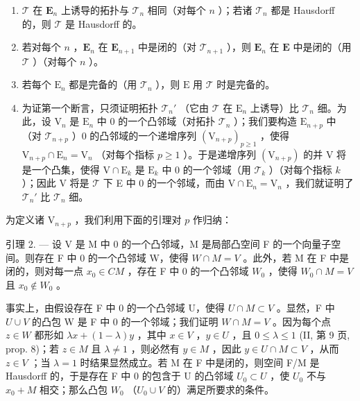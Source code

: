 \begin{enumerate}
\def\labelenumi{(\roman{enumi})}
\item
  \(\mathcal{T}\) 在 \(\mathbf{E}_n\) 上诱导的拓扑与 \(\mathcal{T}_n\) 相同（对每个 \(n\) ）；若诸 \(\mathcal{T}_n\) 都是 Hausdorff 的，则 \(\mathcal{T}\) 是 Hausdorff 的。
\item
  若对每个 \(n\) ，\(\mathbf{E}_n\) 在 \(\mathbf{E}_{n+1}\) 中是闭的（对 \(\mathcal{T}_{n+1}\) ），则 \(\mathbf{E}_n\) 在 \(\mathbf{E}\) 中是闭的（用 \(\mathcal{T}\) ）（对每个 \(n\) ）。
\item
  若每个 \(\mathrm{E}_n\) 都是完备的（用 \(\mathcal{T}_n\) ），则 \(\mathrm{E}\) 用 \(\mathcal{T}\) 时是完备的。
\item
  为证第一个断言，只须证明拓扑 \(\mathcal{T}_n'\) （它由 \(\mathcal{T}\) 在 \(\mathrm{E}_n\) 上诱导）比 \(\mathcal{T}_n\) 细。为此，设 \(\mathrm{V}_n\) 是 \(\mathrm{E}_n\) 中 0 的一个凸邻域（对拓扑 \(\mathcal{T}_n\) ）；我们要构造 \(\mathrm{E}_{n+p}\) 中（对 \(\mathcal{T}_{n+p}\) ）0 的凸邻域的一个递增序列 \((\mathrm{V}_{n+p})_{p\geqslant 1}\) ，使得 \(\mathrm{V}_{n+p} \cap \mathrm{E}_n = \mathrm{V}_n\) （对每个指标 \(p \geqslant 1\) ）。于是递增序列 \((\mathrm{V}_{n+p})\) 的并 V 将是一个凸集，使得 \(\mathrm{V} \cap \mathrm{E}_k\) 是 \(\mathrm{E}_k\) 中 0 的一个邻域（用 \(\mathcal{T}_k\) ）（对每个指标 \(k\) ）；因此 V 将是 \(\mathcal{T}\) 下 E 中 0 的一个邻域，而由 \(\mathrm{V} \cap \mathrm{E}_n = \mathrm{V}_n\) ，我们就证明了 \(\mathcal{T}_n'\) 比 \(\mathcal{T}_n\) 细。
\end{enumerate}

为定义诸 \(\mathrm{V}_{n + p}\) ，我们利用下面的引理对 \(p\) 作归纳：

引理 2. --- 设 V 是 M 中 0 的一个凸邻域，M 是局部凸空间 F 的一个向量子空间。则存在 F 中 0 的一个凸邻域 W，使得 \(W \cap M = V\) 。此外，若 M 在 F 中是闭的，则对每一点 \(x_{0} \in C M\) ，存在 F 中 0 的一个凸邻域 \(W_{0}\) ，使得 \(W_{0} \cap M = V\) 且 \(x_{0} \notin W_{0}\) 。

事实上，由假设存在 F 中 0 的一个凸邻域 U，使得 \(U \cap M \subset V\) 。显然，F 中 \(U \cup V\) 的凸包 W 是 F 中 0 的一个邻域；我们证明 \(W \cap M = V\) 。因为每个点 \(z \in W\) 都形如 \(\lambda x + (1 - \lambda)y\) ，其中 \(x \in V\) ，\(y \in U\) ，且 \(0 \leqslant \lambda \leqslant 1\) (II, 第 9 页, prop. 8)；若 \(z \in M\) 且 \(\lambda \neq 1\) ，则必然有 \(y \in M\) ，因此 \(y \in U \cap M \subset V\) ，从而 \(z \in V\) ；当 \(\lambda = 1\) 时结果显然成立。若 M 在 F 中是闭的，则空间 F/M 是 Hausdorff 的，于是存在 F 中 0 的包含于 U 的凸邻域 \(U_0 \subset U\) ，使 \(U_0\) 不与 \(x_0 + M\) 相交；那么凸包 \(W_0\) （\(U_0 \cup V\) 的）满足所要求的条件。

